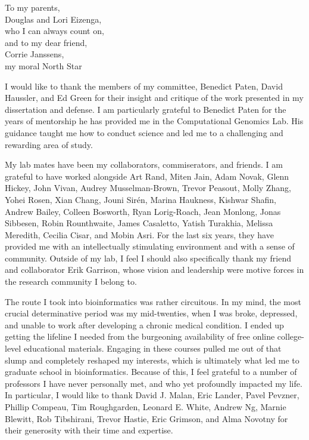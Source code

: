 \documentclass[11pt]{ucthesis}
\begin{document}
\begin{frontmatter}
\begin{dedication}
\null\vfil
{\large
\begin{center}
To my parents,\\%
Douglas and Lori Eizenga,\\%
who I can always count on, \\\vspace{48pt}
and to my dear friend, \\%
Corrie Janssens,\\%
my moral North Star
\end{center}}
\vfil\null
\end{dedication}


\begin{acknowledgements}

I would like to thank the members of my committee, Benedict Paten, David Haussler, and Ed Green for their insight and critique of the work presented in my dissertation and defense. I am particularly grateful to Benedict Paten for the years of mentorship he has provided me in the Computational Genomics Lab. His guidance taught me how to conduct science and led me to a challenging and rewarding area of study.

My lab mates have been my collaborators, commiserators, and friends. I am grateful to have worked alongside Art Rand, Miten Jain, Adam Novak, Glenn Hickey, John Vivan, Audrey Musselman-Brown, Trevor Peasout, Molly Zhang, Yohei Rosen, Xian Chang, Jouni Sir{\'e}n, Marina Haukness, Kishwar Shafin, Andrew Bailey, Colleen Bosworth, Ryan Lorig-Roach, Jean Monlong, Jonas Sibbesen, Robin Rounthwaite, James Casaletto, Yatish Turakhia, Melissa Meredith, Cecilia Cisar, and Mobin Asri. For the last six years, they have provided me with an intellectually stimulating environment and with a sense of community. Outside of my lab, I feel I should also specifically thank my friend and collaborator Erik Garrison, whose vision and leadership were motive forces in the research community I belong to.

The route I took into bioinformatics was rather circuitous. In my mind, the most crucial determinative period was my mid-twenties, when I was broke, depressed, and unable to work after developing a chronic medical condition. I ended up getting the lifeline I needed from the burgeoning availability of free online college-level educational materials. Engaging in these courses pulled me out of that slump and completely reshaped my interests, which is ultimately what led me to graduate school in bioinformatics. Because of this, I feel grateful to a number of professors I have never personally met, and who yet profoundly impacted my life. In particular, I would like to thank David J. Malan, Eric Lander, Pavel Pevzner, Phillip Compeau, Tim Roughgarden, Leonard E. White, Andrew Ng, Marnie Blewitt, Rob Tibshirani, Trevor Hastie, Eric Grimson, and Alma Novotny for their generosity with their time and expertise.


\end{acknowledgements}
\end{frontmatter}
\end{document}
